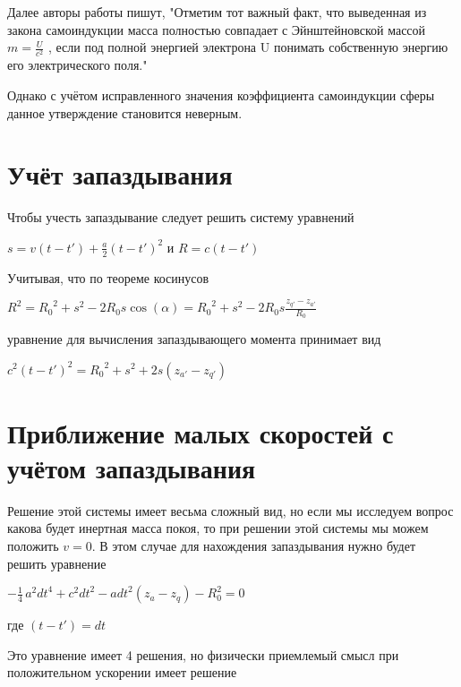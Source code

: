 \documentclass{article}
\begin{document}
Далее авторы  работы \cite{misyuchenko} пишут, "Отметим тот важный факт, что выведенная из закона самоиндукции масса полностью совпадает с Эйнштейновской массой $m=\frac{U}{c^2}$ , если под полной энергией электрона U понимать собственную энергию его электрического поля."

Однако с учётом исправленного значения коэффициента самоиндукции сферы данное утверждение становится неверным. 


\section{Учёт запаздывания}

Чтобы учесть запаздывание следует решить систему уравнений

$s=v\left( t-t' \right)+\frac{a}{2}{{\left( t-t' \right)}^{2}}$
и
$R=c\left( t-t' \right)$

Учитывая, что по теореме косинусов

${{R}^{2}}={{R}_{0}}^{2}+{{s}^{2}}-2{{R}_{0}}s\cos \left( \alpha  \right)={{R}_{0}}^{2}+{{s}^{2}}-2{{R}_{0}}s\frac{{{z}_{q'}}-{{z}_{a'}}}{{{R}_{0}}}$

уравнение для вычисления запаздывающего момента принимает вид

$c^{2}\left( t-t' \right)^{2}={{R}_{0}}^{2}+{{s}^{2}}+2s\left( {{z}_{a'}}-{{z}_{q'}} \right)$

\section{Приближение малых скоростей с учётом запаздывания}
Решение этой системы имеет весьма сложный вид, но если мы исследуем вопрос какова будет инертная масса покоя, то при решении этой системы мы можем положить $v = 0$. В этом случае для нахождения запаздывания нужно будет решить уравнение

$-\frac{1}{4} \, a^{2} \mathit{dt}^{4} + c^{2} \mathit{dt}^{2} - a \mathit{dt}^{2} {\left(z_{a} - z_{q}\right)} - R_{0}^{2} = 0$

где
$(t-t') = dt$

Это уравнение имеет 4 решения, но физически приемлемый смысл при положительном ускорении имеет решение


\end{document}
